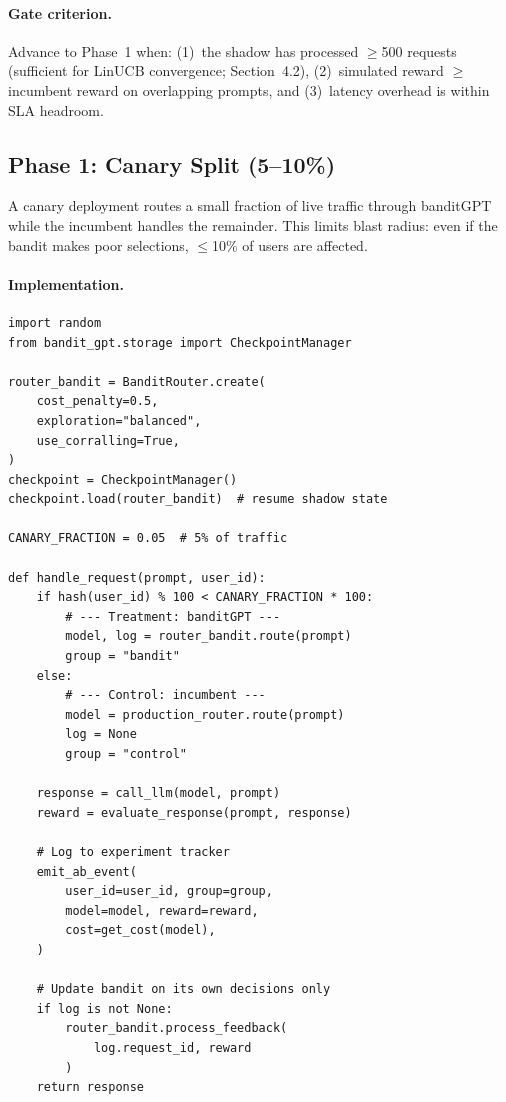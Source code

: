 \paragraph{Gate criterion.}
Advance to Phase~1 when: (1)~the shadow has processed $\geq$500 requests (sufficient for LinUCB convergence; Section~4.2), (2)~simulated reward $\geq$ incumbent reward on overlapping prompts, and (3)~latency overhead is within SLA headroom.


\subsection{Phase 1: Canary Split (5--10\%)}
\label{app:ab_canary}

A canary deployment routes a small fraction of live traffic through banditGPT while the incumbent handles the remainder.
This limits blast radius: even if the bandit makes poor selections, $\leq$10\% of users are affected.

\paragraph{Implementation.}

{\small\begin{verbatim}
import random
from bandit_gpt.storage import CheckpointManager

router_bandit = BanditRouter.create(
    cost_penalty=0.5,
    exploration="balanced",
    use_corralling=True,
)
checkpoint = CheckpointManager()
checkpoint.load(router_bandit)  # resume shadow state

CANARY_FRACTION = 0.05  # 5% of traffic

def handle_request(prompt, user_id):
    if hash(user_id) % 100 < CANARY_FRACTION * 100:
        # --- Treatment: banditGPT ---
        model, log = router_bandit.route(prompt)
        group = "bandit"
    else:
        # --- Control: incumbent ---
        model = production_router.route(prompt)
        log = None
        group = "control"

    response = call_llm(model, prompt)
    reward = evaluate_response(prompt, response)

    # Log to experiment tracker
    emit_ab_event(
        user_id=user_id, group=group,
        model=model, reward=reward,
        cost=get_cost(model),
    )

    # Update bandit on its own decisions only
    if log is not None:
        router_bandit.process_feedback(
            log.request_id, reward
        )
    return response
\end{verbatim}}

